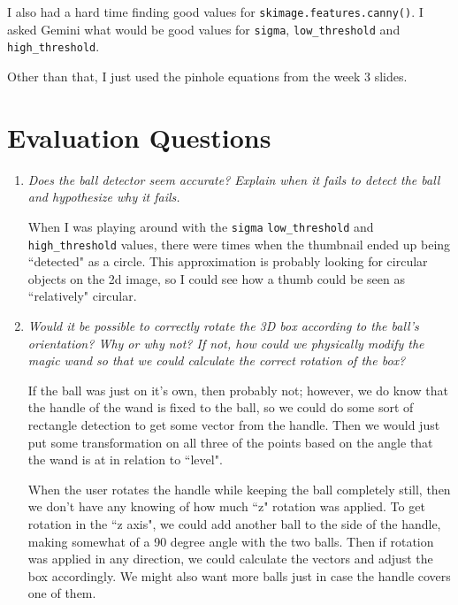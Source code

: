 \documentclass[11pt]{article}
\begin{document}
I also had a hard time finding good values for \lstinline{skimage.features.canny()}.
I asked Gemini what would be good values for \lstinline{sigma}, \lstinline{low_threshold} and \lstinline{high_threshold}.

Other than that, I just used the pinhole equations from the week 3 slides.

\section{Evaluation Questions}

\begin{enumerate}

	\item \textit {Does the ball detector seem accurate? Explain when it fails to detect the ball and hypothesize why it fails.}

		When I was playing around with the \lstinline{sigma} \lstinline{low_threshold} and \lstinline{high_threshold} values, there were times when the thumbnail ended up being ``detected" as a circle. This approximation is probably looking for circular objects on the 2d image, so I could see how a thumb could be seen as ``relatively" circular.

	\item \textit{Would it be possible to correctly rotate the 3D box according to the ball's orientation? Why or why not? If not, how could we physically modify the magic wand so that we could calculate the correct rotation of the box?}

		If the ball was just on it's own, then probably not; however, we do know that the handle of the wand is fixed to the ball, so we could do some sort of rectangle detection to get some vector from the handle. Then we would just put some transformation on all three of the points based on the angle that the wand is at in relation to ``level".

		When the user rotates the handle while keeping the ball completely still, then we don't have any knowing of how much ``z" rotation was applied. To get rotation in the ``z axis", we could add another ball to the side of the handle, making somewhat of a 90 degree angle with the two balls. Then if rotation was applied in any direction, we could calculate the vectors and adjust the box accordingly. We might also want more balls just in case the handle covers one of them.

\end{enumerate}
\end{document}
